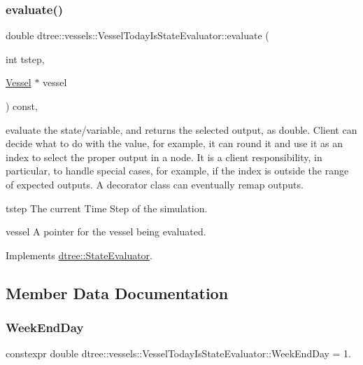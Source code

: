 \subsubsection{\texorpdfstring{evaluate()}{evaluate()}}
{\footnotesize\ttfamily double dtree\+::vessels\+::\+Vessel\+Today\+Is\+State\+Evaluator\+::evaluate (\begin{DoxyParamCaption}\item[{int}]{tstep,  }\item[{\mbox{\hyperlink{class_vessel}{Vessel}} $\ast$}]{vessel }\end{DoxyParamCaption}) const\hspace{0.3cm}{\ttfamily [inline]}, {\ttfamily [virtual]}}



evaluate the state/variable, and returns the selected output, as double. Client can decide what to do with the value, for example, it can round it and use it as an index to select the proper output in a node. It is a client responsibility, in particular, to handle special cases, for example, if the index is outside the range of expected outputs. A decorator class can eventually remap outputs. 

\begin{DoxyItemize}
\item tstep The current Time Step of the simulation. \item vessel A pointer for the vessel being evaluated. \end{DoxyItemize}


Implements \mbox{\hyperlink{classdtree_1_1_state_evaluator_ab57666219fbdc728f40d9d5acd5726cb}{dtree\+::\+State\+Evaluator}}.



\subsection{Member Data Documentation}
\mbox{\label{classdtree_1_1vessels_1_1_vessel_today_is_state_evaluator_a4003d9e6bb39dfbeadb2d6adf866a399}} 
\subsubsection{\texorpdfstring{WeekEndDay}{WeekEndDay}}
{\footnotesize\ttfamily constexpr double dtree\+::vessels\+::\+Vessel\+Today\+Is\+State\+Evaluator\+::\+Week\+End\+Day = 1.\hspace{0.3cm}{\ttfamily [static]}}

